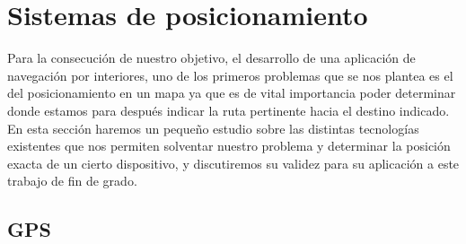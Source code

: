 %


\section{Sistemas de posicionamiento}
\label{sec:sisPos}
Para la consecución de nuestro objetivo, el desarrollo de una aplicación de navegación por interiores, uno de los primeros problemas que se nos plantea es el del posicionamiento en un mapa ya que es de vital importancia poder determinar donde estamos para después indicar la ruta pertinente hacia el destino indicado. En esta sección haremos un pequeño estudio sobre las distintas tecnologías existentes que nos permiten solventar nuestro problema y determinar la posición exacta de un cierto dispositivo, y discutiremos su validez para su aplicación a este trabajo de fin de grado.

\subsection{GPS}


